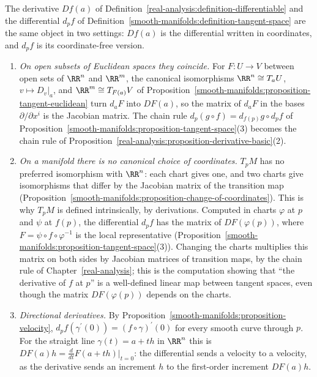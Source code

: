 \begin{remark}\label{smooth-manifolds:remark-differential-derivative}
The derivative $Df(a)$ of Definition~\ref{real-analysis:definition-differentiable} and the differential $d_pf$ of Definition~\ref{smooth-manifolds:definition-tangent-space} are the same
object in two settings: $Df(a)$ is the differential written in coordinates, and $d_pf$ is its coordinate-free version.
\begin{enumerate}
\item \emph{On open subsets of Euclidean spaces they coincide.} For $F \colon U \to V$ between open sets of $\RR^n$ and $\RR^m$, the canonical isomorphisms $\RR^n \cong T_aU$, $v \mapsto D_v|_a$, and $\RR^m \cong T_{F(a)}V$ of
Proposition~\ref{smooth-manifolds:proposition-tangent-euclidean} turn $d_aF$ into $DF(a)$, so the matrix of $d_aF$ in the bases $\partial/\partial x^i$ is the Jacobian matrix. The chain rule
$d_p(g \circ f) = d_{f(p)}g \circ d_pf$ of Proposition~\ref{smooth-manifolds:proposition-tangent-space}(3) becomes the chain rule of Proposition~\ref{real-analysis:proposition-derivative-basic}(2).
\item \emph{On a manifold there is no canonical choice of coordinates.} $T_pM$ has no preferred isomorphism with $\RR^n$: each chart gives one, and two charts give isomorphisms that differ by the Jacobian matrix of the
transition map (Proposition~\ref{smooth-manifolds:proposition-change-of-coordinates}). This is why $T_pM$ is defined intrinsically, by derivations. Computed in charts $\varphi$ at $p$ and $\psi$ at $f(p)$, the differential
$d_pf$ has the matrix of $DF(\varphi(p))$, where $F = \psi \circ f \circ \varphi^{-1}$ is the local representative (Proposition~\ref{smooth-manifolds:proposition-tangent-space}(3)). Changing the charts multiplies this matrix
on both sides by Jacobian matrices of transition maps, by the chain rule of Chapter~\ref{real-analysis}; this is the computation showing that ``the derivative of $f$ at $p$'' is a well-defined linear map between tangent
spaces, even though the matrix $DF(\varphi(p))$ depends on the charts.
\item \emph{Directional derivatives.} By Proposition~\ref{smooth-manifolds:proposition-velocity}, $d_pf(\gamma^{\prime}(0)) = (f \circ \gamma)^{\prime}(0)$ for every smooth curve through $p$. For the straight line $\gamma(t) = a + th$ in $\RR^n$ this is
$DF(a)h = \frac{d}{dt}F(a + th)|_{t=0}$: the differential sends a velocity to a velocity, as the derivative sends an increment $h$ to the first-order increment $DF(a)h$.

\end{enumerate}
\end{remark}
